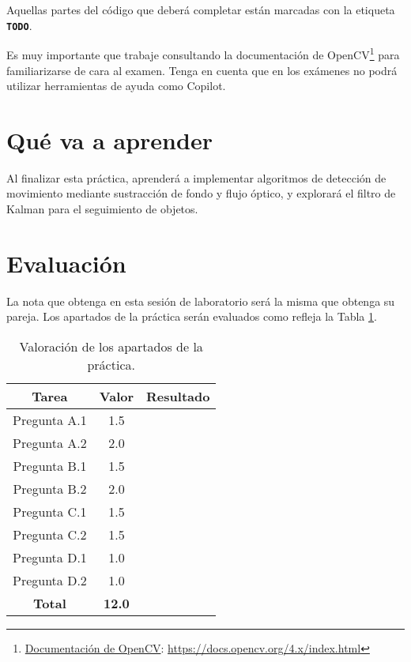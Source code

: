 Aquellas partes del código que deberá completar están marcadas con la etiqueta \textbf{\texttt{TODO}}.

Es muy importante que trabaje consultando la documentación de OpenCV\footnote{\href{https://docs.opencv.org/4.x/index.html}{Documentación de OpenCV}: \url{https://docs.opencv.org/4.x/index.html}} para familiarizarse de cara al examen. Tenga en cuenta que en los exámenes no podrá utilizar herramientas de ayuda como Copilot.

\section{Qué va a aprender}

Al finalizar esta práctica, aprenderá a implementar algoritmos de detección de movimiento mediante sustracción de fondo y flujo óptico, y explorará el filtro de Kalman para el seguimiento de objetos.

\section{Evaluación}

La nota que obtenga en esta sesión de laboratorio será la misma que obtenga su pareja. Los apartados de la práctica serán evaluados como refleja la Tabla \ref{table:evaluacion}.

\begin{table}[h!]
    \centering
    \begin{tabular}{|c|c|c|}
    \hline
    \textbf{Tarea} & \textbf{Valor} & \textbf{Resultado} \\
    \hline
    Pregunta A.1 & 1.5 & \\
    \hline
    Pregunta A.2 & 2.0 & \\
    \hline
    Pregunta B.1 & 1.5 & \\
    \hline
    Pregunta B.2 & 2.0 & \\
    \hline
    Pregunta C.1 & 1.5 & \\
    \hline
    Pregunta C.2 & 1.5 & \\
    \hline
    Pregunta D.1 & 1.0 & \\
    \hline
    Pregunta D.2 & 1.0 & \\
    \hline
    \textbf{Total} & \textbf{12.0} & \\
    \hline
    \end{tabular}
    \caption{Valoración de los apartados de la práctica.}
    \label{table:evaluacion}
\end{table}
